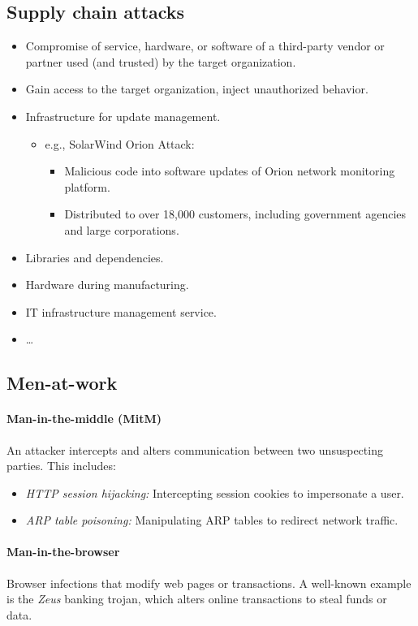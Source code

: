 \subsection{Supply chain attacks}
\begin{itemize}
  \item Compromise of service, hardware, or software of a third-party vendor or partner used (and trusted) by the target organization.
  \item Gain access to the target organization, inject unauthorized behavior.
  \item Infrastructure for update management.
    \begin{itemize}
      \item e.g., SolarWind Orion Attack:
        \begin{itemize}
          \item Malicious code into software updates of Orion network monitoring platform.
          \item Distributed to over 18,000 customers, including government agencies and large corporations.
        \end{itemize}
    \end{itemize}
  \item Libraries and dependencies.
  \item Hardware during manufacturing.
  \item IT infrastructure management service.
  \item \ldots
\end{itemize}
\subsection{Men-at-work}
\paragraph{Man-in-the-middle (MitM)}
An attacker intercepts and alters communication between two
unsuspecting parties. This includes:
\begin{itemize}
    \item \textit{HTTP session hijacking:} Intercepting session cookies to impersonate a user.
    \item \textit{ARP table poisoning:} Manipulating ARP tables to redirect network traffic.
\end{itemize}

\paragraph{Man-in-the-browser}
Browser infections that modify web pages or transactions. A well-known
example is the \textit{Zeus} banking trojan, which alters online
transactions to steal funds or data.


